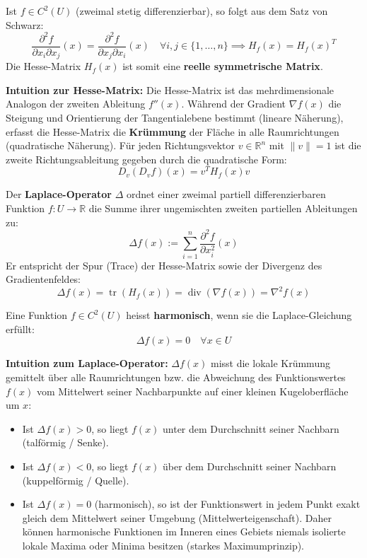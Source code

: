 \begin{theorem}
    Ist $f \in C^2(U)$ (zweimal stetig differenzierbar), so folgt aus dem Satz von Schwarz:
    $$ \frac{\partial^2 f}{\partial x_i \partial x_j}(x) = \frac{\partial^2 f}{\partial x_j \partial x_i}(x) \quad \forall i, j \in \{1, \dots, n\} \implies H_f(x) = H_f(x)^T$$
    Die Hesse-Matrix $H_f(x)$ ist somit eine \textbf{reelle symmetrische Matrix}.
\end{theorem}

\begin{remark}
    \textbf{Intuition zur Hesse-Matrix:} Die Hesse-Matrix ist das mehrdimensionale Analogon der zweiten Ableitung $f''(x)$. Während der Gradient $\nabla f(x)$ die Steigung und Orientierung der Tangentialebene bestimmt (lineare Näherung), erfasst die Hesse-Matrix die \textbf{Krümmung} der Fläche in alle Raumrichtungen (quadratische Näherung). Für jeden Richtungsvektor $v \in \mathbb{R}^n$ mit $\|v\|=1$ ist die zweite Richtungsableitung gegeben durch die quadratische Form:
    $$ D_v(D_v f)(x) = v^T H_f(x) v $$
\end{remark}

\begin{definition}
    Der \textbf{Laplace-Operator} $\Delta$ ordnet einer zweimal partiell differenzierbaren Funktion $f: U \to \mathbb{R}$ die Summe ihrer ungemischten zweiten partiellen Ableitungen zu:
    $$ \Delta f(x) := \sum_{i=1}^n \frac{\partial^2 f}{\partial x_i^2}(x) $$
    Er entspricht der Spur (Trace) der Hesse-Matrix sowie der Divergenz des Gradientenfeldes:
    $$ \Delta f(x) = \operatorname{tr}(H_f(x)) = \operatorname{div}(\nabla f(x)) = \nabla^2 f(x)$$
\end{definition}

\begin{remark}
    Eine Funktion $f \in C^2(U)$ heisst \textbf{harmonisch}, wenn sie die Laplace-Gleichung erfüllt:
    $$ \Delta f(x) = 0 \quad \forall x \in U $$
\end{remark}

\begin{remark}
    \textbf{Intuition zum Laplace-Operator:} $\Delta f(x)$ misst die lokale Krümmung gemittelt über alle Raumrichtungen bzw. die Abweichung des Funktionswertes $f(x)$ vom Mittelwert seiner Nachbarpunkte auf einer kleinen Kugeloberfläche um $x$:
    \begin{itemize}
        \item Ist $\Delta f(x) > 0$, so liegt $f(x)$ unter dem Durchschnitt seiner Nachbarn (talförmig / Senke).
        \item Ist $\Delta f(x) < 0$, so liegt $f(x)$ über dem Durchschnitt seiner Nachbarn (kuppelförmig / Quelle).
        \item Ist $\Delta f(x) = 0$ (harmonisch), so ist der Funktionswert in jedem Punkt exakt gleich dem Mittelwert seiner Umgebung (Mittelwerteigenschaft). Daher können harmonische Funktionen im Inneren eines Gebiets niemals isolierte lokale Maxima oder Minima besitzen (starkes Maximumprinzip).
    \end{itemize}
\end{remark}

